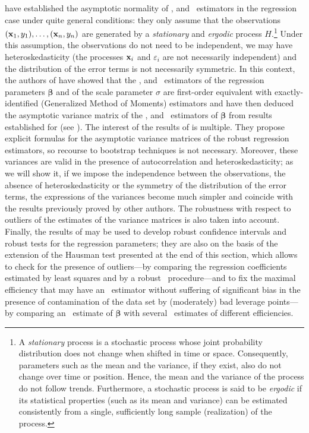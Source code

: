 \citet{Croux:2003} have established the asymptotic normality of ,
 and ~estimators in the regression case under quite general
conditions: they only assume that the observations $(\mathbf x_1, y_1), \dots,
(\mathbf x_n, y_n)$ are generated by a \emph{stationary} and \emph{ergodic}
process $H$.\footnote{A \emph{stationary} process is a stochastic process whose
joint probability distribution does not change when shifted in time or space.
Consequently, parameters such as the mean and the variance, if they exist, also
do not change over time or position. Hence, the mean and the variance of the
process do not follow trends. Furthermore, a stochastic process is said to be
\emph{ergodic} if its statistical properties (such as its mean and variance)
can be estimated consistently from a single, sufficiently long sample
(realization) of the process.} Under this assumption, the observations do not
need to be independent, we may have heteroskedasticity (the processes
$\mathbf x_i$ and $\varepsilon_i$ are not necessarily independent) and the
distribution of the error terms is not necessarily symmetric. In this context,
the authors of \citet{Croux:2003} have showed that the ,  and
~estimators of the regression parameters $\boldsymbol\beta$ and of the
scale parameter $\sigma$ are first-order equivalent with exactly-identified 
(Generalized Method of Moments) estimators and have then deduced the asymptotic
variance matrix of the ,  and ~estimators of
$\boldsymbol\beta$ from results established for  (see
\citealp{Hansen:1982}). The interest of the results of \citet{Croux:2003} is
multiple. They propose explicit formulas for the asymptotic variance matrices
of the robust regression estimators, so recourse to bootstrap techniques is not
necessary. Moreover, these variances are valid in the presence of
autocorrelation and heteroskedasticity; as we will show it, if we impose the
independence between the observations, the absence of heteroskedasticity or the
symmetry of the distribution of the error terms, the expressions of the
variances become much simpler and coincide with the results previously proved
by other authors. The robustness with respect to outliers of the estimates of
the variance matrices is also taken into account. Finally, the results of
\citet{Croux:2003} may be used to develop robust confidence intervals and
robust tests for the regression parameters; they are also on the basis of the
extension of the Hausman test presented at the end of this section, which
allows to check for the presence of outliers---by comparing the regression
coefficients estimated by least squares and by a robust 
~procedure---and to fix the maximal efficiency that may have an 
~estimator without suffering of significant bias in the presence of
contamination of the data set by (moderately) bad leverage points---by
comparing an ~estimate of $\boldsymbol\beta$ with several 
~estimates of different efficiencies.

